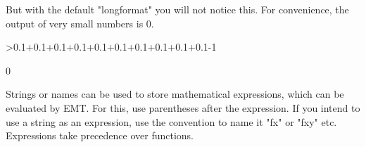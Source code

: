 \documentclass{article}
\begin{document}
\begin{eulernotebook}
\begin{eulercomment}
But with the default "longformat" you will not notice this. For convenience,
the output of very small numbers is 0.
\end{eulercomment}
\begin{eulerprompt}
>0.1+0.1+0.1+0.1+0.1+0.1+0.1+0.1+0.1+0.1-1
\end{eulerprompt}
\begin{euleroutput}
  0
\end{euleroutput}
\begin{eulercomment}
Strings or names can be used to store mathematical expressions, which can be evaluated
by EMT. For this, use parentheses after the expression. If you intend to use a string
as an expression, use the convention to name it "fx" or "fxy" etc. Expressions take
precedence over functions.


\end{eulercomment}
\end{eulernotebook}
\end{document}
